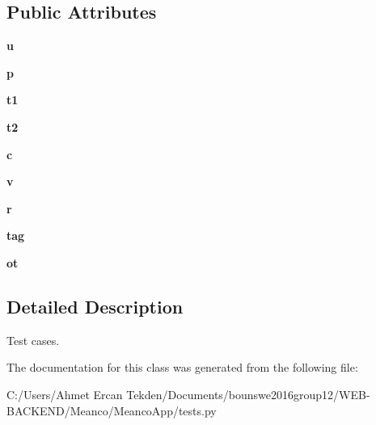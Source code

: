 \subsection*{Public Attributes}
\begin{DoxyCompactItemize}
\item 
\hypertarget{class_meanco_app_1_1tests_1_1_model_test_cases_a38f0f6b75731f7773291502f83a66f40}{}\label{class_meanco_app_1_1tests_1_1_model_test_cases_a38f0f6b75731f7773291502f83a66f40} 
{\bfseries u}
\item 
\hypertarget{class_meanco_app_1_1tests_1_1_model_test_cases_a34a4c5613cea8c5dc5a48c89fbeae01a}{}\label{class_meanco_app_1_1tests_1_1_model_test_cases_a34a4c5613cea8c5dc5a48c89fbeae01a} 
{\bfseries p}
\item 
\hypertarget{class_meanco_app_1_1tests_1_1_model_test_cases_adb755a0151de82854ea267afe8aae541}{}\label{class_meanco_app_1_1tests_1_1_model_test_cases_adb755a0151de82854ea267afe8aae541} 
{\bfseries t1}
\item 
\hypertarget{class_meanco_app_1_1tests_1_1_model_test_cases_ab728c5d30336cdc29baac90973e3967b}{}\label{class_meanco_app_1_1tests_1_1_model_test_cases_ab728c5d30336cdc29baac90973e3967b} 
{\bfseries t2}
\item 
\hypertarget{class_meanco_app_1_1tests_1_1_model_test_cases_a1f71b18be7b5afe57f6be37edc11c4df}{}\label{class_meanco_app_1_1tests_1_1_model_test_cases_a1f71b18be7b5afe57f6be37edc11c4df} 
{\bfseries c}
\item 
\hypertarget{class_meanco_app_1_1tests_1_1_model_test_cases_a915b184bf42bf78f06b30781278a30a2}{}\label{class_meanco_app_1_1tests_1_1_model_test_cases_a915b184bf42bf78f06b30781278a30a2} 
{\bfseries v}
\item 
\hypertarget{class_meanco_app_1_1tests_1_1_model_test_cases_a51815ec1ef150f4412dba5dad5e13a5d}{}\label{class_meanco_app_1_1tests_1_1_model_test_cases_a51815ec1ef150f4412dba5dad5e13a5d} 
{\bfseries r}
\item 
\hypertarget{class_meanco_app_1_1tests_1_1_model_test_cases_a36f5ef68991110b954a5e85c42a30bae}{}\label{class_meanco_app_1_1tests_1_1_model_test_cases_a36f5ef68991110b954a5e85c42a30bae} 
{\bfseries tag}
\item 
\hypertarget{class_meanco_app_1_1tests_1_1_model_test_cases_ab4c594e4c23bef82dbd96e79c14fd97d}{}\label{class_meanco_app_1_1tests_1_1_model_test_cases_ab4c594e4c23bef82dbd96e79c14fd97d} 
{\bfseries ot}
\end{DoxyCompactItemize}


\subsection{Detailed Description}
Test cases. 

The documentation for this class was generated from the following file\+:\begin{DoxyCompactItemize}
\item 
C\+:/\+Users/\+Ahmet Ercan Tekden/\+Documents/bounswe2016group12/\+W\+E\+B-\/\+B\+A\+C\+K\+E\+N\+D/\+Meanco/\+Meanco\+App/tests.\+py\end{DoxyCompactItemize}
